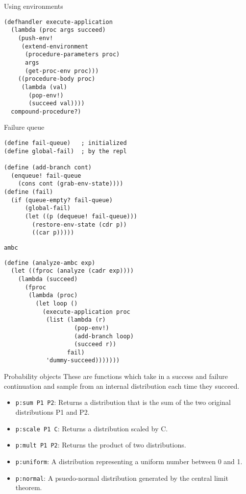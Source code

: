 \documentclass[14pt]{beamer}
\begin{document}
\begin{frame}[fragile]{Using environments}
  \begin{lstlisting}
(defhandler execute-application
  (lambda (proc args succeed)
    (push-env!
     (extend-environment
      (procedure-parameters proc)
      args
      (get-proc-env proc)))
    ((procedure-body proc)
     (lambda (val)
       (pop-env!)
       (succeed val))))
  compound-procedure?)
  \end{lstlisting}
\end{frame}

\begin{frame}[fragile]{Failure queue}
  \begin{lstlisting}
(define fail-queue)   ; initialized
(define global-fail)  ; by the repl

(define (add-branch cont)
  (enqueue! fail-queue
    (cons cont (grab-env-state))))
(define (fail)
  (if (queue-empty? fail-queue)
      (global-fail)
      (let ((p (dequeue! fail-queue)))
        (restore-env-state (cdr p))
        ((car p)))))
  \end{lstlisting}
\end{frame}

\begin{frame}[fragile]{\texttt{ambc}}
  \begin{lstlisting}
(define (analyze-ambc exp)
  (let ((fproc (analyze (cadr exp))))
    (lambda (succeed)
      (fproc
       (lambda (proc)
         (let loop ()
           (execute-application proc
            (list (lambda (r)
                    (pop-env!)
                    (add-branch loop)
                    (succeed r))
                  fail)
            'dummy-succeed)))))))
  \end{lstlisting}
\end{frame}

\begin{frame}{Probability objects}
  These are functions which take in a success and failure continuation
  and sample from an internal distribution each time they succeed.
  \pause
  \begin{itemize}
  \item \texttt{p:sum P1 P2}: Returns a distribution that is the sum
    of the two original distributions P1 and P2.
  \item \texttt{p:scale P1 C}: Returns a distribution scaled by C.
  \item \texttt{p:mult P1 P2}: Returns the product of two
    distributions.
  \item \texttt{p:uniform}: A distribution representing a uniform
    number between 0 and 1.
  \item \texttt{p:normal}: A psuedo-normal distribution generated by
    the central limit theorem.
  \end{itemize}
\end{frame}
\end{document}
